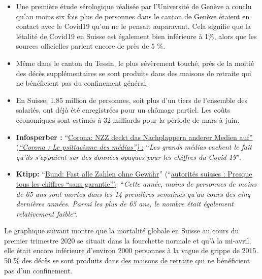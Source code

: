 \begin{itemize}
\tightlist
\item
  Une première étude sérologique réalisée par l'Université de Genève a
  conclu qu'au moins six fois plus de personnes dans le canton de Genève
  étaient en contact avec le Covid19 qu'on ne le pensait auparavant.
  Cela signifie que la létalité de Covid19 en Suisse est également bien
  inférieure à 1\%, alors que les sources officielles parlent encore de
  près de 5 \%.
\item
  Même dans le canton du Tessin, le plus sévèrement touché, près de la
  moitié des décès supplémentaires se sont produits dans des maisons de
  retraite qui ne bénéficient pas du confinement général.
\item
  En Suisse, 1,85 million de personnes, soit plus d'un tiers de
  l'ensemble des salariés, ont déjà été enregistrées pour un chômage
  partiel. Les coûts économiques sont estimés à 32 milliards pour la
  période de mars à juin.
\item
  \textbf{Infosperber :}
  ``\href{https://www.infosperber.ch/Artikel/Medien/Corona-NZZ-deckt-das-Nachplappern-anderer-Medien-auf}{Corona:
  NZZ deckt das Nachplappern anderer Medien auf''}
  (\href{https://www.infosperber.ch/Artikel/Medien/Corona-NZZ-deckt-das-Nachplappern-anderer-Medien-auf}{\emph{``Corona
  : Le psittacisme des médias'')} :} ``\emph{Les grands médias cachent
  le fait qu'ils s'appuient sur des données opaques pour les chiffres du
  Covid-19″}.
\item
  \textbf{Ktipp:}
  ``\href{https://www.ktipp.ch/artikel/artikeldetail/bund-fast-alle-zahlen-ohne-gewaehr/}{Bund:
  Fast alle Zahlen ohne Gewähr}''
  (``\href{https://www.ktipp.ch/artikel/artikeldetail/bund-fast-alle-zahlen-ohne-gewaehr/}{autorités
  suisses : Presque tous les chiffres ``sans garantie'')}: ``\emph{Cette
  année, moins de personnes de moins de 65 ans sont mortes dans les 14
  premières semaines qu'au cours des cinq dernières années. Parmi les
  plus de 65 ans, le nombre était également relativement faible}``.
\end{itemize}

Le graphique suivant montre que la mortalité globale en Suisse au cours
du premier trimestre 2020 se situait dans la fourchette normale et qu'à
la mi-avril, elle était encore inférieure d'environ 2000 personnes à la
vague de grippe de 2015. 50 \% des décès se sont produits dans
\href{https://www.nzz.ch/zuerich/coronavirus-zuerich-aendert-nun-das-testregime-in-heimenauch-viele-aeltere-covid-19-infizierte-entwickeln-keine-symptome-zuerich-aendert-nun-das-testregime-in-heimen-ld.1552089}{des
maisons de retraite} qui ne bénéficient pas d'un confinement.

